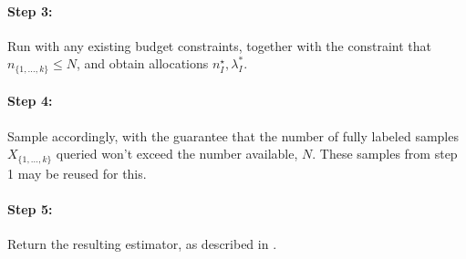 \documentclass{article} %
\begin{document}
\paragraph{Step 3:} Run  with any existing budget constraints, together with the constraint that $n_{\{1,\dots,k\}}\leq N$, and obtain allocations $n^\star_I,\lambda^*_I$.

\paragraph{Step 4:} Sample accordingly, with the guarantee that the number of fully labeled samples $X_{\{1,\dots,k\}}$ queried won't exceed the number available, $N$. These samples from step 1 may be reused for this.

\paragraph{Step 5:} Return the resulting estimator, as described in .

\end{document}

